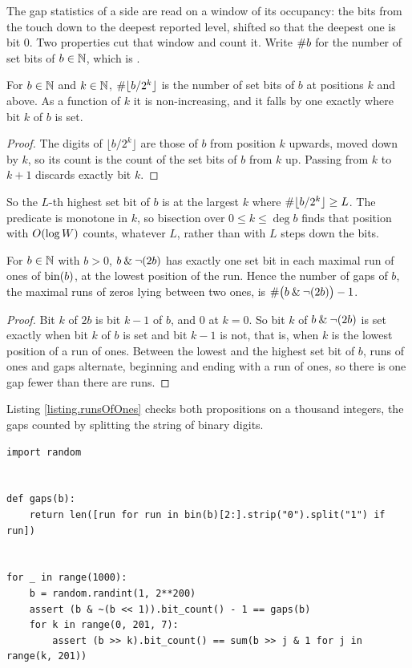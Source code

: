The gap statistics of a side are read on a window of its occupancy:
the bits from the touch down to the deepest reported level,
shifted so that the deepest one is bit $0$.
Two properties cut that window and count it.
Write $\#{b}$ for the number of set bits of $b \in \mathbb{N}$, which is .

\begin{prop}\label{prop.rankByShift}
 For $b \in \mathbb{N}$ and $k \in \mathbb{N}$,
 $\#{\lfloor b / 2^{k} \rfloor}$ is the number of set bits of $b$ at positions $k$
 and above.
 As a function of $k$ it is non-increasing,
 and it falls by one exactly where bit $k$ of $b$ is set.
\end{prop}
\begin{proof}
 The digits of $\lfloor b/2^k \rfloor$ are those of $b$ from position $k$ upwards, moved down by
 $k$, so its count is the count of the set bits of $b$ from $k$ up.
 Passing from $k$ to $k+1$ discards exactly bit $k$.
\end{proof}

So the $L$-th highest set bit of $b$ is at the largest $k$ where
$\#{\lfloor b/2^k \rfloor} \geq L$.
The predicate is monotone in $k$, so bisection over $0 \leq k \leq \deg b$ finds that position
with $O(\log W)$ counts, whatever $L$,
rather than with $L$ steps down the bits.

\begin{prop}\label{prop.runsOfOnes}
 For $b \in \mathbb{N}$ with $b > 0$, $b \mathbin{\&} \neg(2b)$ has exactly one set bit in each maximal run
 of ones of $\mathrm{bin}(b)$, at the lowest position of the run.
 Hence the number of gaps of $b$, the maximal runs of zeros lying between two ones, is
 $\#{\big(b \mathbin{\&} \neg(2b)\big)} - 1$.
\end{prop}
\begin{proof}
 Bit $k$ of $2b$ is bit $k-1$ of $b$, and $0$ at $k = 0$.
 So bit $k$ of $b \mathbin{\&} \neg(2b)$ is set exactly when bit $k$ of $b$ is set
 and bit $k-1$ is not, that is, when $k$ is the lowest position of a run of ones.
 Between the lowest and the highest set bit of $b$, runs of ones and gaps alternate,
 beginning and ending with a run of ones, so there is one gap fewer than there are runs.
\end{proof}

Listing \ref{listing.runsOfOnes} checks both propositions on a thousand integers,
the gaps counted by splitting the string of binary digits.

\begin{lstlisting}[caption={Counting above a position, and counting the gaps.}, label=listing.runsOfOnes]
import random


def gaps(b):
    return len([run for run in bin(b)[2:].strip("0").split("1") if run])


for _ in range(1000):
    b = random.randint(1, 2**200)
    assert (b & ~(b << 1)).bit_count() - 1 == gaps(b)
    for k in range(0, 201, 7):
        assert (b >> k).bit_count() == sum(b >> j & 1 for j in range(k, 201))
\end{lstlisting}
